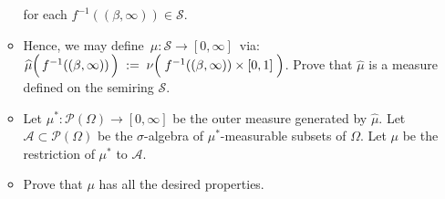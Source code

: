 \begin{itemize}
\begin{itemize}
		for each $f^{-1}((\beta,\infty)) \in \mathcal{S}$.
		\vskip 0.05cm
	\item
		Hence, we may define \,$\widehat{\mu} : \mathcal{S} \longrightarrow [0,\infty]$\, via:
		\;$\widehat{\mu}\!\left(\,f^{-1}((\beta,\overset{{\color{white}-}}{\infty}))\,\right)
		\; := \;
			\nu\!\left(\; f^{-1}((\beta,\overset{{\color{white}-}}{\infty})) \times [0,1] \;\right)$.
		\vskip 0.05cm
		Prove that $\widehat{\mu}$ is a measure defined on the semiring $\mathcal{S}$.
	\item
		Let $\mu^{*} : \mathcal{P}(\Omega) \longrightarrow [0,\infty]$ be the outer measure generated by $\widehat{\mu}$.
		\vskip 0.05cm
		Let $\mathcal{A} \subset \mathcal{P}(\Omega)$ be the $\sigma$-algebra of $\mu^{*}$-measurable
		subsets of $\Omega$.
		\vskip 0.05cm
		Let $\mu$ be the restriction of $\mu^{*}$ to $\mathcal{A}$.
	\item
		Prove that $\mu$ has all the desired properties.
	\end{itemize}
\end{itemize}


\renewcommand{\theenumi}{\roman{enumi}}
\renewcommand{\labelenumi}{\textnormal{(\theenumi)}$\;\;$}

